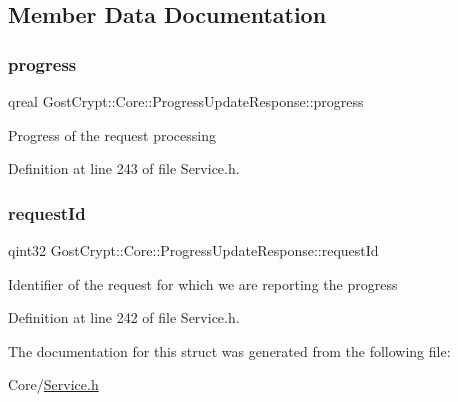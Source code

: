\subsection{Member Data Documentation}
\mbox{\label{struct_gost_crypt_1_1_core_1_1_progress_update_response_a1d0053c0054485f9ea095c2a151b0232}} 
\subsubsection{\texorpdfstring{progress}{progress}}
{\footnotesize\ttfamily qreal Gost\+Crypt\+::\+Core\+::\+Progress\+Update\+Response\+::progress}

Progress of the request processing 

Definition at line 243 of file Service.\+h.

\mbox{\label{struct_gost_crypt_1_1_core_1_1_progress_update_response_afe056ab386502612ab55ac0933e24361}} 
\subsubsection{\texorpdfstring{request\+Id}{requestId}}
{\footnotesize\ttfamily qint32 Gost\+Crypt\+::\+Core\+::\+Progress\+Update\+Response\+::request\+Id}

Identifier of the request for which we are reporting the progress 

Definition at line 242 of file Service.\+h.



The documentation for this struct was generated from the following file\+:\begin{DoxyCompactItemize}
\item 
Core/\hyperlink{_service_8h}{Service.\+h}\end{DoxyCompactItemize}
